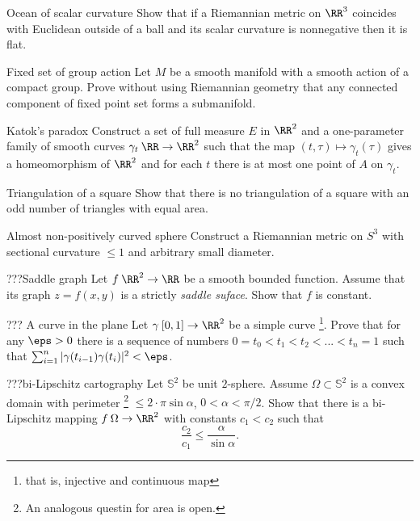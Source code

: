 \begin{pr}{}{Ocean of scalar curvature} Show that if a Riemannian metric on $\RR^3$ coincides with Euclidean outside of a ball and its scalar curvature is nonnegative then it is flat.
\end{pr}

\begin{pr}{}{Fixed set of group action} Let $M$ be a smooth manifold with a smooth action of a compact group.
Prove without using Riemannian geometry that any connected component of fixed point set forms a submanifold.
\end{pr}

\begin{pr}{\hard}{Katok's paradox}
Construct a set of full measure $E$ in $\RR^2$ and a one-parameter family of smooth curves $\gamma_t\:\RR\to\RR^2$ such that the map $(t,\tau)\mapsto\gamma_t(\tau)$ gives a homeomorphism of $\RR^2$ and for each $t$ there is at most one point of $A$ on $\gamma_t$.
\end{pr}

\begin{pr}{\hard}{Triangulation of a square} 
Show that there is no triangulation of a square with an odd number of triangles with equal area.
\end{pr}

\begin{pr}{\hard}{Almost non-positively curved sphere}  Construct a Riemannian metric on $S^3$ with sectional curvature $\le 1$ and arbitrary small diameter.
\end{pr}

\begin{pr}{}{???Saddle graph}
Let $f\:\RR^2\to\RR$ be a smooth bounded function.
Assume that its graph $z=f(x,y)$ is a strictly \emph{saddle suface}.
Show that $f$ is constant. 
\end{pr}

\begin{pr}{}{??? A curve in the plane}
Let $\gamma\:[0,1]\to \RR^2$ be a simple curve%
\footnote{that is, injective and continuous map}.
Prove that for any $\eps>0$ there is a sequence of numbers
$0=t_0<t_1<t_2<...<t_n=1$ such that
$\sum_{i=1}^n|\gamma(t_{i-1})\gamma(t_{i})|^2<\eps$.
\end{pr}


\begin{pr}{}{???bi-Lipschitz cartography} Let $\mathbb{S}^2$ be unit $2$-sphere.
Assume $\Omega\subset \mathbb{S}^2$ is a convex domain with perimeter%
\footnote{An analogous questin for area is open.}
$\le 2\cdot\pi\sin\alpha$, $0<\alpha<\pi/2$.
Show that there is a bi-Lipschitz mapping $f\:\Omega\to \RR^2$
with constants $c_1 < c_2$ such that
$$\frac{c_2}{c_1}\le \frac{\alpha}{\sin\alpha}.$$
\end{pr}


